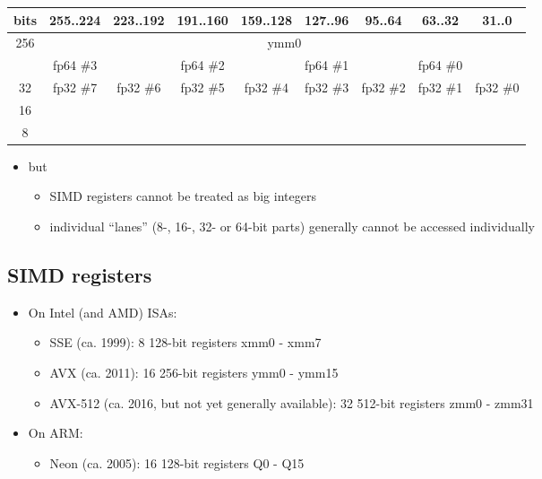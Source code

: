 \documentclass[12pt]{article}
\begin{document}
\begin{tabular}{|c|c|c|c|c|c|c|c|c|}
\hline
bits                   & 255..224             & 223..192             & 191..160             & 159..128             & 127..96              & 95..64               & 63..32               & 31..0                \\ \hline
\multirow{2}{*}{256}   & \multicolumn{8}{c|}{ymm0}                                                                                                                                  \\ \hline
64                     & fp64 \#3             &                      & fp64 \#2             &                      & fp64 \#1             &                      & fp64 \#0             &                      \\ \hline
32                     & fp32 \#7             & fp32 \#6             & fp32 \#5             & fp32 \#4             & fp32 \#3             & fp32 \#2             & fp32 \#1             & fp32 \#0             \\ \hline
16                     & \multicolumn{2}{c|}{}                      & \multicolumn{2}{c|}{}                      & \multicolumn{2}{c|}{}                      & \multicolumn{2}{c|}{}                      \\ \hline
8                      & \multicolumn{8}{c|}{}                                                                                                                                      \\ \hline
\end{tabular}

\begin{itemize}
    \item but
    \begin{itemize}
        \item SIMD registers cannot be treated as big integers
        \item individual ``lanes'' (8-, 16-, 32- or 64-bit parts) generally cannot be accessed individually
    \end{itemize}
\end{itemize}

\subsection{SIMD registers}
\begin{itemize}
    \item On Intel (and AMD) ISAs:
    \begin{itemize}
        \item SSE (ca. 1999): 8 128-bit registers xmm0 - xmm7
        \item AVX (ca. 2011): 16 256-bit registers ymm0 - ymm15
        \item AVX-512 (ca. 2016, but not yet generally available): 32 512-bit registers zmm0 - zmm31
    \end{itemize}
    \item On ARM:
    \begin{itemize}
        \item Neon (ca. 2005): 16 128-bit registers Q0 - Q15
    \end{itemize}
\end{itemize}
\end{document}
